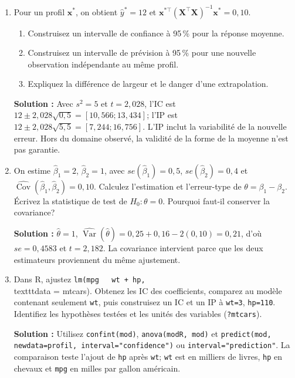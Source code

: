 \documentclass[letterpaper,11pt]{article}
\newcommand{\var}{\operatorname{Var}}
\newcommand{\bo}[1]{\bm{#1}}
\newcommand{\prof}[1]{\ifdefined\avecsolutions\par{\color{blue}\textbf{Solution :} #1}\par\fi}
\begin{document}
\begin{enumerate}[leftmargin=*,wide,label=\bfseries Exercice \arabic*:]
\begin{enumerate}[label=\alph*)]
\end{enumerate}
\prof{$F=((240-180)/2)/(180/36)=6$. On rejette l'hypothèse que les deux coefficients ajoutés sont simultanément nuls. La décomposition en sommes de carrés et la loi $F$ utilisée supposent l'emboîtement des espaces de modèles.}
\item Pour un profil $\bo x^*$, on obtient $\hat y^*=12$ et $\bo x^{*\top}(\bo X^\top\bo X)^{-1}\bo x^*=0{,}10$.
\begin{enumerate}[label=\alph*)]
\item Construisez un intervalle de confiance à 95\,\% pour la réponse moyenne.
\item Construisez un intervalle de prévision à 95\,\% pour une nouvelle observation indépendante au même profil.
\item Expliquez la différence de largeur et le danger d'une extrapolation.
\end{enumerate}
\prof{Avec $s^2=5$ et $t=2{,}028$, l'IC est $12\pm2{,}028\sqrt{0{,}5}=[10{,}566;13{,}434]$; l'IP est $12\pm2{,}028\sqrt{5{,}5}=[7{,}244;16{,}756]$. L'IP inclut la variabilité de la nouvelle erreur. Hors du domaine observé, la validité de la forme de la moyenne n'est pas garantie.}
\item On estime $\hat\beta_1=2$, $\hat\beta_2=1$, avec $se(\hat\beta_1)=0{,}5$, $se(\hat\beta_2)=0{,}4$ et $\widehat{\operatorname{Cov}}(\hat\beta_1,\hat\beta_2)=0{,}10$.
Calculez l'estimation et l'erreur-type de $\theta=\beta_1-\beta_2$. Écrivez la statistique de test de $H_0:\theta=0$. Pourquoi faut-il conserver la covariance?
\prof{$\hat\theta=1$, $\widehat{\var}(\hat\theta)=0{,}25+0{,}16-2(0{,}10)=0{,}21$, d'où $se=0{,}4583$ et $t=2{,}182$. La covariance intervient parce que les deux estimateurs proviennent du même ajustement.}
\item Dans R, ajustez \texttt{lm(mpg \string~ wt + hp,} \\texttt{data = mtcars)}. Obtenez les IC des coefficients, comparez au modèle contenant seulement \texttt{wt}, puis construisez un IC et un IP à \texttt{wt=3}, \texttt{hp=110}. Identifiez les hypothèses testées et les unités des variables (\texttt{?mtcars}).
\prof{Utilisez \texttt{confint(mod)}, \texttt{anova(modR, mod)} et \texttt{predict(mod, newdata=profil, interval="confidence")} ou \texttt{interval="prediction"}. La comparaison teste l'ajout de \texttt{hp} après \texttt{wt}; \texttt{wt} est en milliers de livres, \texttt{hp} en chevaux et \texttt{mpg} en milles par gallon américain.}
\end{enumerate}
\end{document}
